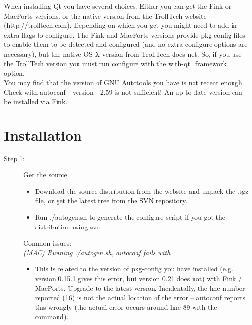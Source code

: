 When installing Qt you have several choices. Either you can get the Fink or MacPorts versions, or the native version from the TrollTech website (http://trolltech.com). Depending on which you get you might need to add in extra flags to {\sffamily configure}. The Fink and MacPorts versions provide pkg-config files to enable them to be detected and configured (and no extra {\sffamily configure} options are necessary), but the native OS X version from TrollTech does not. So, if you use the TrollTech version you must run {\sffamily configure} with the {\sffamily {-}{-}with-qt=framework} option.\\

You may find that the version of GNU Autotools you have is not recent enough. Check with {\sffamily autoconf {-}{-}version} - 2.59 is not sufficient! An up-to-date version can be installed via Fink.\\

\section{Installation}

\begin{description}
	\item[Step 1:\its] Get the source.
	\begin{itemize}
		\item Download the source distribution from the website and unpack the .tgz file, or get the latest tree from the SVN repository.
		\item Run {\sffamily ./autogen.sh} to generate the {\sffamily configure} script if you got the distribution using svn.
	\end{itemize}
	Common issues:\\
	\emph{(MAC) Running {\sffamily ./autogen.sh}, autoconf fails with .}
	\begin{itemize}
		\item This is related to the version of pkg-config you have installed (e.g. version 0.15.1 gives this error, but version 0.21 does not) with Fink / MacPorts. Upgrade to the latest version. Incidentally, the line-number reported (16) is not the actual location of the error -- autoconf reports this wrongly (the actual error occurs around line 89 with the \qte{PKG\_CHECK\_MODULES(GTK28, ..., [AC\_DEFINE...} command).
	\end{itemize}
\end{description}

